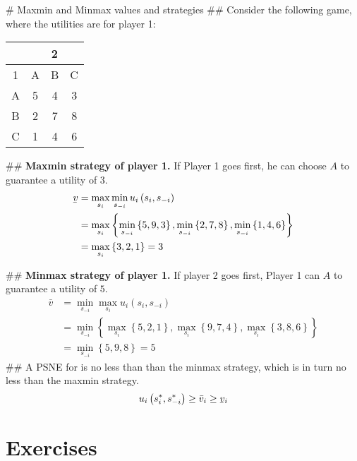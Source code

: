 \documentclass[12pt, a4paper]{article}
\newcommand{\ubar}[1]{\underaccent{\bar}{#1}}
\begin{document}
\begin{easylist}[itemize]
	# Maxmin and Minmax values and strategies
	## Consider the following game, where the utilities are for player 1:
	\begin{table}[ht!]
		\centering
		\begin{tabular}{|c|c|c|c|} \hline
			& \multicolumn{3}{|c|}{2} \\ \hline
			1 & A & B & C \\ \hline
			A & 5 & 4 & 3  \\ \hline
			B & 2 & 7 & 8 \\ \hline
			C & 1 & 4 & 6 \\ \hline
		\end{tabular}
	\end{table}
	## \textbf{Maxmin strategy of player 1.} If Player 1 goes first, he can choose $A$ to guarantee a utility of $3$.
	\begin{align*}
	\ubar{v} &= \max_{s_{i}} \min_{s_{-i}}  u_i
	\left( s_i, s_{-i} \right)
	\\
	&=
	\max_{s_{i}}
	\left\{ 
	\min_{s_{-i}} \left\{ 5, 9, 3 \right\},
	\min_{s_{-i}} \left\{ 2, 7, 8 \right\},
	\min_{s_{-i}} \left\{ 1, 4, 6 \right\}
	\right\} \\
	&=
	\max_{s_{i}}
	\left\{ 
	3, 2, 1
	\right\} = 3
	\end{align*}
	
	## \textbf{Minmax strategy of player 1.} If player 2 goes first, Player 1 can $A$ to guarantee a utility of $5$.
	\begin{align*}
	\bar{v} &= \min_{s_{-i}} \max_{s_{i}}   u_i
	\left( s_i, s_{-i} \right)
	\\
	&=
	\min_{s_{-i}}
	\left\{ 
	\max_{s_{i}} \left\{ 5, 2, 1 \right\},
	\max_{s_{i}}  \left\{ 9, 7, 4 \right\},
	\max_{s_{i}}  \left\{ 3, 8, 6 \right\}
	\right\} \\
	&=
	\min_{s_{-i}}
	\left\{ 
	5, 9, 8
	\right\} = 5
	\end{align*}
	## A PSNE for is no less than than the minmax strategy, which is in turn no less than the maxmin strategy.
	\begin{equation*}
		u_i \left( s_i^*, s_{-i}^* \right)
		\geq
		\bar{v}_i
		\geq
		\ubar{v}_i
	\end{equation*}
	
\end{easylist}




\clearpage
\section{Exercises}
\end{document}

